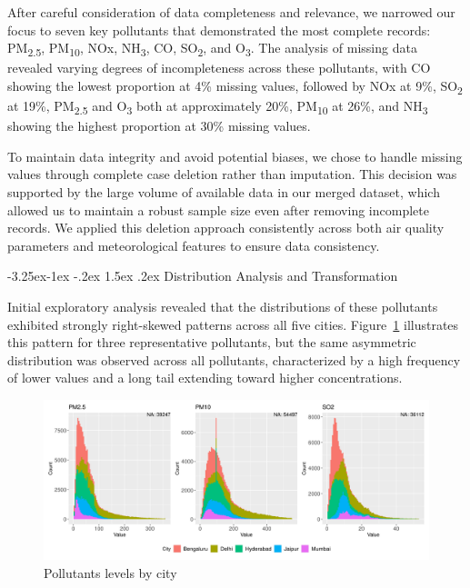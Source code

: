 \documentclass[twoside,11pt]{article}
\makeatletter
\renewcommand\subsubsection{\@startsection{subsubsection}{3}{\z@}%
  {-3.25ex\@plus -1ex \@minus -.2ex}%
  {1.5ex \@plus .2ex}%
  {\normalfont\bfseries\normalsize}}
\makeatother
\begin{document}
After careful consideration of data completeness and relevance, we narrowed our focus to seven key pollutants that demonstrated the most complete records: PM\textsubscript{2.5}, PM\textsubscript{10}, NOx, NH\textsubscript{3}, CO, SO\textsubscript{2}, and O\textsubscript{3}. The analysis of missing data revealed varying degrees of incompleteness across these pollutants, with CO showing the lowest proportion at 4\% missing values, followed by NOx at 9\%, SO\textsubscript{2} at 19\%, PM\textsubscript{2.5} and O\textsubscript{3} both at approximately 20\%, PM\textsubscript{10} at 26\%, and NH\textsubscript{3} showing the highest proportion at 30\% missing values.

To maintain data integrity and avoid potential biases, we chose to handle missing values through complete case deletion rather than imputation. This decision was supported by the large volume of available data in our merged dataset, which allowed us to maintain a robust sample size even after removing incomplete records. We applied this deletion approach consistently across both air quality parameters and meteorological features to ensure data consistency.

\subsubsection{Distribution Analysis and Transformation}

Initial exploratory analysis revealed that the distributions of these pollutants exhibited strongly right-skewed patterns across all five cities. Figure~\ref{fig:skewness} illustrates this pattern for three representative pollutants, but the same asymmetric distribution was observed across all pollutants, characterized by a high frequency of lower values and a long tail extending toward higher concentrations.

\begin{figure}[H]
  \centering
  \includegraphics[width=\textwidth]{assets/skewness.png}
  \caption{Pollutants levels by city}
  \label{fig:skewness}
\end{figure}
\end{document}
